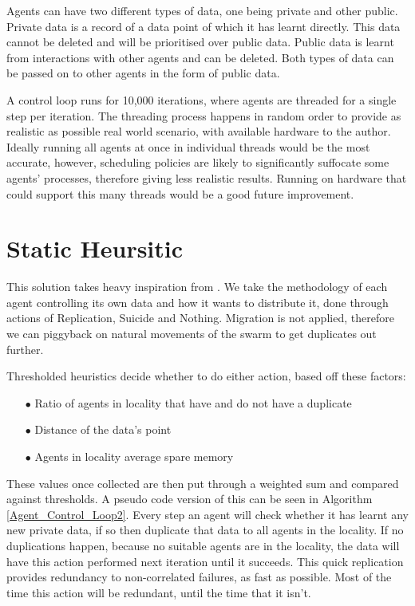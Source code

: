 \documentclass{UoYCSproject}
\begin{document}
Agents can have two different types of data, one being private and other public. 
Private data is a record of a data point of which it has learnt directly. 
This data cannot be deleted and will be prioritised over public data. 
Public data is learnt from interactions with other agents and can be deleted. 
Both types of data can be passed on to other agents in the form of public data.

A control loop runs for 10,000 iterations, where agents are threaded for a single step per iteration. 
The threading process happens in random order to provide as realistic as possible real world scenario, with available hardware to the author. 
Ideally running all agents at once in individual threads would be the most accurate, however, scheduling policies are likely to significantly suffocate some agents' processes, therefore giving less realistic results. 
Running on hardware that could support this many threads would be a good future improvement.


\section{Static Heursitic}
\label{sec:Simple2}

This solution takes heavy inspiration from \cite{Distributed Storage}. 
We take the methodology of each agent controlling its own data and how it wants to distribute it, done through actions of Replication, Suicide and Nothing.
Migration is not applied, therefore we can piggyback on natural movements of the swarm to get duplicates out further.

Thresholded heuristics decide whether to do either action, based off these factors:

\begin{itemize}
\itemsep-1em
\item[$\bullet$] Ratio of agents in locality that have and do not have a duplicate
\item[$\bullet$] Distance of the data’s point
\item[$\bullet$] Agents in locality average spare memory
\end{itemize}

These values once collected are then put through a weighted sum and compared against thresholds. 
A pseudo code version of this can be seen in Algorithm \ref{Agent_Control_Loop2}.
Every step an agent will check whether it has learnt any new private data, if so then duplicate that data to all agents in the locality.
If no duplications happen, because no suitable agents are in the locality, the data will have this action performed next iteration until it succeeds.
This quick replication provides redundancy to non-correlated failures, as fast as possible. 
Most of the time this action will be redundant, until the time that it isn’t.
\end{document}
